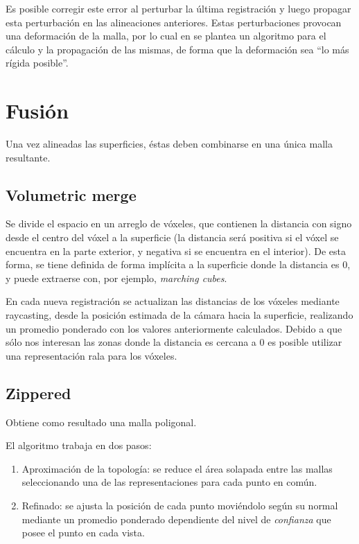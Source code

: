 			Es posible corregir este error al perturbar la última registración
			y luego propagar esta perturbación en las alineaciones anteriores.
			Estas perturbaciones provocan una deformación de la malla, por lo
			cual
			en \cite{5457479}
			se plantea un algoritmo para el cálculo y la propagación de las
			mismas, de forma que la deformación sea ``lo más rígida posible''.

	\section{Fusión}
		Una vez alineadas las superficies, éstas deben combinarse en una única malla resultante.

		\subsection{Volumetric merge}
		Se divide el espacio en un arreglo de vóxeles, que contienen la
		distancia con signo desde el centro del vóxel a la superficie (la
		distancia será positiva si el vóxel se encuentra en la parte exterior, y
		negativa si se encuentra en el interior).
		De esta forma,
		se tiene definida de forma implícita a la
		superficie donde la distancia es 0, y puede extraerse con, por ejemplo, \emph{marching cubes}.

		En cada nueva registración se actualizan las distancias de los
		vóxeles mediante raycasting,
		desde la posición estimada de la cámara hacia la superficie,
		realizando un promedio ponderado con los valores anteriormente calculados.\cite{Curless:1996:VMB:237170.237269} %
		Debido a que sólo nos interesan las zonas donde la distancia es cercana a 0 es posible utilizar una representación rala para los vóxeles.\cite{Steinbrucker:2013:LMS:2586117.2586926} %


		\subsection{Zippered}
		Obtiene como resultado una malla poligonal.

		El algoritmo trabaja en dos pasos:
		\begin{enumerate}
			\item Aproximación de la topología: se reduce el área solapada
				entre las mallas seleccionando una de las representaciones para
				cada punto en común.
			\item Refinado: se ajusta la posición de cada punto moviéndolo
				según su normal mediante un promedio ponderado dependiente del
				nivel de \emph{confianza} que posee el punto en cada vista.\cite{Turk:1994:ZPM:192161.192241}
		\end{enumerate}

